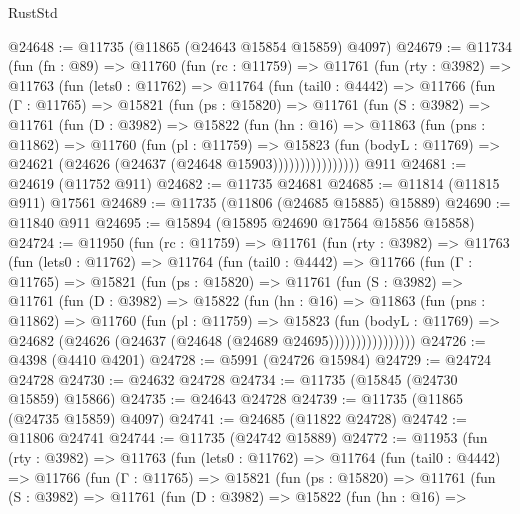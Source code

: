 \begin{lexlean}{RustStd}
\begin{coremodule}
@24648 := @11735 (@11865 (@24643 @15854 @15859) @4097)
@24679 := @11734
    (fun (fn : @89) =>
    @11760
      (fun (rc : @11759) =>
      @11761
        (fun (rty : @3982) =>
        @11763
          (fun (lets0 : @11762) =>
          @11764
            (fun (tail0 : @4442) =>
            @11766
              (fun (Γ : @11765) =>
              @15821
                (fun (ps : @15820) =>
                @11761
                  (fun (S : @3982) =>
                  @11761
                    (fun (D : @3982) =>
                    @15822
                      (fun (hn : @16) =>
                      @11863
                        (fun (pns : @11862) =>
                        @11760
                          (fun (pl : @11759) =>
                          @15823
                            (fun (bodyL : @11769) =>
                            @24621 (@24626 (@24637 (@24648 @15903))))))))))))))))
    @911
@24681 := @24619 (@11752 @911)
@24682 := @11735 @24681
@24685 := @11814 (@11815 @911) @17561
@24689 := @11735 (@11806 (@24685 @15885) @15889)
@24690 := @11840 @911
@24695 := @15894 (@15895 @24690 @17564 @15856 @15858)
@24724 := @11950
    (fun (rc : @11759) =>
    @11761
      (fun (rty : @3982) =>
      @11763
        (fun (lets0 : @11762) =>
        @11764
          (fun (tail0 : @4442) =>
          @11766
            (fun (Γ : @11765) =>
            @15821
              (fun (ps : @15820) =>
              @11761
                (fun (S : @3982) =>
                @11761
                  (fun (D : @3982) =>
                  @15822
                    (fun (hn : @16) =>
                    @11863
                      (fun (pns : @11862) =>
                      @11760
                        (fun (pl : @11759) =>
                        @15823
                          (fun (bodyL : @11769) =>
                          @24682 (@24626 (@24637 (@24648 (@24689 @24695))))))))))))))))
@24726 := @4398 (@4410 @4201)
@24728 := @5991 (@24726 @15984)
@24729 := @24724 @24728
@24730 := @24632 @24728
@24734 := @11735 (@15845 (@24730 @15859) @15866)
@24735 := @24643 @24728
@24739 := @11735 (@11865 (@24735 @15859) @4097)
@24741 := @24685 (@11822 @24728)
@24742 := @11806 @24741
@24744 := @11735 (@24742 @15889)
@24772 := @11953
    (fun (rty : @3982) =>
    @11763
      (fun (lets0 : @11762) =>
      @11764
        (fun (tail0 : @4442) =>
        @11766
          (fun (Γ : @11765) =>
          @15821
            (fun (ps : @15820) =>
            @11761
              (fun (S : @3982) =>
              @11761
                (fun (D : @3982) =>
                @15822
                  (fun (hn : @16) =>

\end{coremodule}
\end{lexlean}
